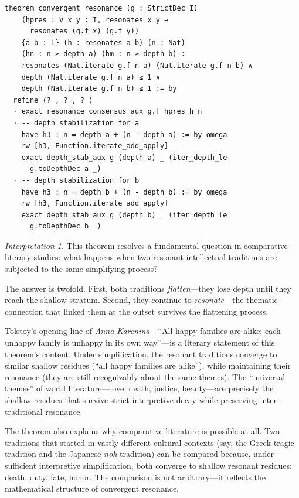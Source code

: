 \documentclass[11pt,openany]{book}
\theoremstyle{definition}
\theoremstyle{plain}
\theoremstyle{remark}
\newtheorem{interpretation}[axiom]{Interpretation}
\begin{document}
\begin{lstlisting}[language=Lean4]
theorem convergent_resonance (g : StrictDec I)
    (hpres : ∀ x y : I, resonates x y →
      resonates (g.f x) (g.f y))
    {a b : I} (h : resonates a b) (n : Nat)
    (hn : n ≥ depth a) (hm : n ≥ depth b) :
    resonates (Nat.iterate g.f n a) (Nat.iterate g.f n b) ∧
    depth (Nat.iterate g.f n a) ≤ 1 ∧
    depth (Nat.iterate g.f n b) ≤ 1 := by
  refine ⟨?_, ?_, ?_⟩
  · exact resonance_consensus_aux g.f hpres h n
  · -- depth stabilization for a
    have h3 : n = depth a + (n - depth a) := by omega
    rw [h3, Function.iterate_add_apply]
    exact depth_stab_aux g (depth a) _ (iter_depth_le
      g.toDepthDec a _)
  · -- depth stabilization for b
    have h3 : n = depth b + (n - depth b) := by omega
    rw [h3, Function.iterate_add_apply]
    exact depth_stab_aux g (depth b) _ (iter_depth_le
      g.toDepthDec b _)
\end{lstlisting}

\begin{interpretation}
This theorem resolves a fundamental question in comparative literary studies: what happens when two resonant intellectual traditions are subjected to the same simplifying process?

The answer is twofold. First, both traditions \emph{flatten}---they lose depth until they reach the shallow stratum. Second, they continue to \emph{resonate}---the thematic connection that linked them at the outset survives the flattening process.

Tolstoy's opening line of \textit{Anna Karenina}---``All happy families are alike; each unhappy family is unhappy in its own way''---is a literary statement of this theorem's content. Under simplification, the resonant traditions converge to similar shallow residues (``all happy families are alike''), while maintaining their resonance (they are still recognizably about the same themes). The ``universal themes'' of world literature---love, death, justice, beauty---are precisely the shallow residues that survive strict interpretive decay while preserving inter-traditional resonance.

The theorem also explains why comparative literature is possible at all. Two traditions that started in vastly different cultural contexts (say, the Greek tragic tradition and the Japanese \textit{noh} tradition) can be compared because, under sufficient interpretive simplification, both converge to shallow resonant residues: death, duty, fate, honor. The comparison is not arbitrary---it reflects the mathematical structure of convergent resonance.
\end{interpretation}
\end{document}
